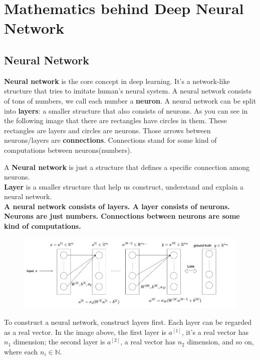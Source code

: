 \documentclass[../main.tex]{subfiles}
\begin{document}
    \section{Mathematics behind Deep Neural Network}
        \subsection{Neural Network}
            \textbf{Neural network} is the core concept in deep learning. It's a network-like structure that tries to imitate human's neural system.
            A neural network consists of tons of numbers, we call each number a  \textbf{neuron}.
            A neural network can be split into \textbf{layers}: a smaller structure that also consists of neurons.
            As you can see in the following image that there are rectangles have circles in them. These rectangles are layers and circles are neurons.
            Those arrows between neurons/layers are \textbf{connections}. Connections stand for some kind of computations between neurons(numbers).
            \begin{note}
                A \textbf{Neural network} is just a structure that defines a specific connection among neurons.\\
                \textbf{Layer} is a smaller structure that help us construct, understand and explain a neural network.\\
                \textbf{A neural network consists of layers. A layer consists of neurons. Neurons are just numbers. Connections between neurons are some kind of computations.}
            \end{note}
            
            \begin{figure}[h]
                    \includegraphics[width=\textwidth]{DNN.png}
                    \centering
            \end{figure}
            
            To construct a neural network, construct layers first.
            Each layer can be regarded as a real vector.
            In the image above, the first layer is $a^{[1]}$, it's a real vector has $n_1$ dimension; the second layer is $a^{[2]}$, a real vector has $n_2$ dimension, and so on, where each $n_i \in \mathbb{N}$.
            
\end{document}
